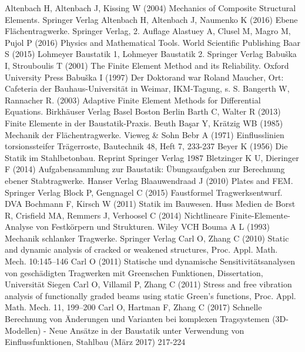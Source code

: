 \begin{thebibliography}{}
 Altenbach H, Altenbach J, Kissing W (2004) Mechanics of Composite Structural Elements. Springer Verlag
 Altenbach H, Altenbach J, Naumenko K (2016) Ebene Fl\"{a}chentragwerke. Springer Verlag, 2. Auflage
 Alastuey A, Clusel M, Magro M, Pujol P (2016) Physics and Mathematical Tools. World Scientific Publishing
 Baar S (2015) Lohmeyer Baustatik 1, Lohmeyer Baustatik 2. Springer Verlag
 Babu\v{s}ka I, Strouboulis T (2001) The Finite Element Method and its Reliability. Oxford University Press
 Babu\v{s}ka I (1997) Der Doktorand war Roland Maucher, Ort: Cafeteria der Bauhaus-Universit\"{a}t in Weimar, IKM-Tagung, s. S. \pageref{Eq145}
 Bangerth W, Rannacher R. (2003) Adaptive Finite Element Methods for Differential
Equations. Birkh\"{a}user Verlag Basel Boston Berlin
 Barth C, Walter R (2013) Finite Elemente in der Baustatik-Praxis. Beuth
 Ba\c{s}ar Y, Kr\"{a}tzig WB (1985) Mechanik der Fl\"{a}chentragwerke. Vieweg \& Sohn
 Bebr A (1971) \lqq Einflusslinien torsionssteifer Tr\"{a}gerroste\rqq, Bautechnik 48, Heft 7, 233-237
 Beyer K (1956) Die Statik im Stahlbetonbau. Reprint Springer Verlag 1987
 Bletzinger K U, Dieringer F (2014) Aufgabensammlung zur Baustatik: \"{U}bungsaufgaben zur Berechnung ebener Stabtragwerke. Hanser Verlag
 Blaauwendraad J (2010) Plates and FEM. Springer Verlag
 Block P, Gengnagel C (2015) Faustformel Tragwerksentwurf. DVA
 Bochmann F, Kirsch W (2011) Statik im Bauwesen. Huss Medien
 de Borst R, Crisfield MA, Remmers J, Verhoosel C (2014) Nichtlineare Finite-Elemente-Analyse von Festk\"{o}rpern und Strukturen. Wiley VCH
 Bouma A L (1993) Mechanik schlanker Tragwerke. Springer Verlag
 Carl O, Zhang C (2010) \lqq Static and dynamic analysis of cracked or weakened structures\rqq, Proc. Appl. Math. Mech. 10:145--146
 Carl O (2011) Statische und dynamische Sensitivit\"{a}tsanalysen von gesch\"{a}digten Tragwerken mit Greenschen Funktionen, Dissertation, Universit\"{a}t Siegen
 Carl O, Villamil P, Zhang C (2011) \lqq Stress and free vibration analysis of functionally graded beams using static Green's functions\rqq, Proc. Appl. Math. Mech. 11, 199--200
 Carl O, Hartman F, Zhang C (2017) \lqq Schnelle Berechnung von \"{A}nderungen und Varianten bei komplexen Tragsystemen (3D-Modellen) - Neue Ans\"{a}tze in der Baustatik unter Verwendung von Einflussfunktionen\rqq, Stahlbau (M\"{a}rz 2017) 217-224

\end{thebibliography}
